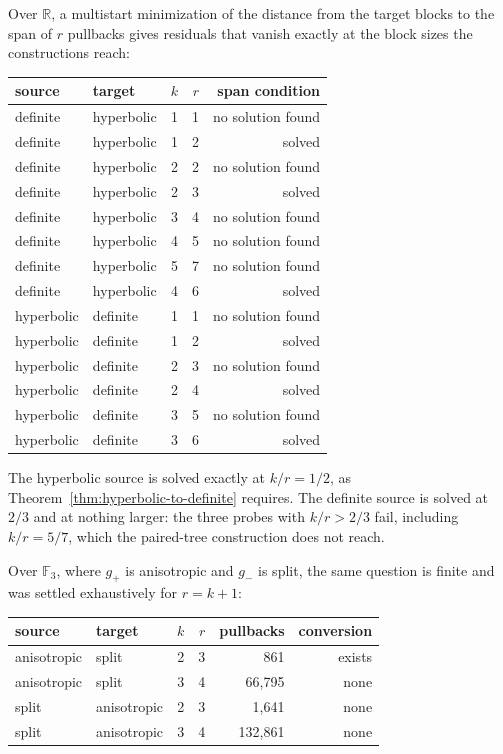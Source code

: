 \documentclass[11pt]{article}
\theoremstyle{definition}
\theoremstyle{plain}
\theoremstyle{remark}
\newcommand{\F}{\mathbb F}
\newcommand{\R}{\mathbb R}
\begin{document}
Over \(\R\), a multistart minimization of the distance from the target blocks
to the span of \(r\) pullbacks gives residuals that vanish exactly at the
block sizes the constructions reach:

\begin{center}
\begin{tabular}{@{}llrrr@{}}
\toprule
source & target & \(k\) & \(r\) & span condition\\
\midrule
definite & hyperbolic & 1 & 1 & no solution found\\
definite & hyperbolic & 1 & 2 & solved\\
definite & hyperbolic & 2 & 2 & no solution found\\
definite & hyperbolic & 2 & 3 & solved\\
definite & hyperbolic & 3 & 4 & no solution found\\
definite & hyperbolic & 4 & 5 & no solution found\\
definite & hyperbolic & 5 & 7 & no solution found\\
definite & hyperbolic & 4 & 6 & solved\\
\midrule
hyperbolic & definite & 1 & 1 & no solution found\\
hyperbolic & definite & 1 & 2 & solved\\
hyperbolic & definite & 2 & 3 & no solution found\\
hyperbolic & definite & 2 & 4 & solved\\
hyperbolic & definite & 3 & 5 & no solution found\\
hyperbolic & definite & 3 & 6 & solved\\
\bottomrule
\end{tabular}
\end{center}

The hyperbolic source is solved exactly at \(k/r=1/2\), as
Theorem~\ref{thm:hyperbolic-to-definite} requires.  The definite source is
solved at \(2/3\) and at nothing larger: the three probes with
\(k/r>2/3\) fail, including \(k/r=5/7\), which the paired-tree construction
does not reach.

Over \(\F_3\), where \(g_+\) is anisotropic and \(g_-\) is split, the same
question is finite and was settled exhaustively for \(r=k+1\):

\begin{center}
\begin{tabular}{@{}llrrrr@{}}
\toprule
source & target & \(k\) & \(r\) & pullbacks & conversion\\
\midrule
anisotropic & split & 2 & 3 & 861 & exists\\
anisotropic & split & 3 & 4 & 66{,}795 & none\\
split & anisotropic & 2 & 3 & 1{,}641 & none\\
split & anisotropic & 3 & 4 & 132{,}861 & none\\
\bottomrule
\end{tabular}
\end{center}
\end{document}
